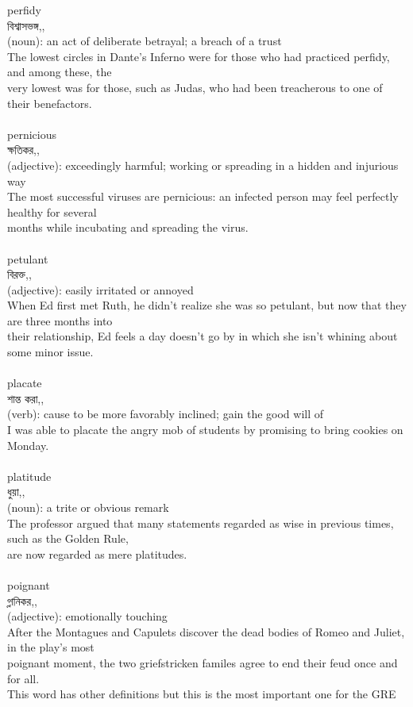 \documentclass{article}
\begin{document}
{perfidy}\\
{বিশ্বাসভঙ্গ,,}\\
{(noun): an act of deliberate betrayal; a breach of a trust\\The lowest circles in Dante's Inferno were for those who had practiced perfidy, and among these, the\\very lowest was for those, such as Judas, who had been treacherous to one of their benefactors.\\}\\
{pernicious}\\
{ক্ষতিকর,,}\\
{(adjective): exceedingly harmful; working or spreading in a hidden and injurious way\\The most successful viruses are pernicious: an infected person may feel perfectly healthy for several\\months while incubating and spreading the virus.\\}\\
{petulant}\\
{বিরক্ত,,}\\
{(adjective): easily irritated or annoyed\\When Ed first met Ruth, he didn't realize she was so petulant, but now that they are three months into\\their relationship, Ed feels a day doesn't go by in which she isn't whining about some minor issue.\\}\\
{placate}\\
{শান্ত করা,,}\\
{(verb): cause to be more favorably inclined; gain the good will of\\I was able to placate the angry mob of students by promising to bring cookies on Monday.\\}\\
{platitude}\\
{ধুয়া,,}\\
{(noun): a trite or obvious remark\\The professor argued that many statements regarded as wise in previous times, such as the Golden Rule,\\are now regarded as mere platitudes.\\}\\
{poignant}\\
{গ্লানিকর,,}\\
{(adjective): emotionally touching\\After the Montagues and Capulets discover the dead bodies of Romeo and Juliet, in the play's most\\poignant moment, the two griefstricken familes agree to end their feud once and for all.\\This word has other definitions but this is the most important one for the GRE\\}\\
\end{document}
